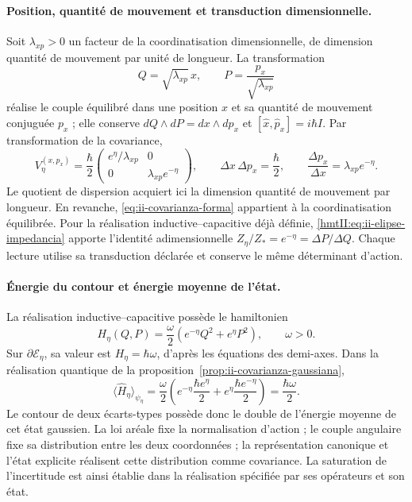\paragraph{Position, quantité de mouvement et transduction dimensionnelle.}
Soit \(\lambda_{xp}>0\) un facteur de la coordinatisation dimensionnelle, de dimension
quantité de mouvement par unité de longueur. La transformation
\[
 Q=\sqrt{\lambda_{xp}}\,x,\qquad
 P=\frac{p_x}{\sqrt{\lambda_{xp}}}
\]
réalise le couple équilibré dans une position \(x\) et sa quantité de mouvement conjuguée
\(p_x\) ; elle conserve \(dQ\wedge dP=dx\wedge dp_x\) et
\([\widehat x,\widehat p_x]=i\hbar I\). Par transformation de la
covariance,
\begin{equation}
 V_\eta^{(x,p_x)}=\frac{\hbar}{2}
 \begin{pmatrix}e^\eta/\lambda_{xp}&0\\
                 0&\lambda_{xp}e^{-\eta}\end{pmatrix},\qquad
 \Delta x\,\Delta p_x=\frac{\hbar}{2},\qquad
 \frac{\Delta p_x}{\Delta x}=\lambda_{xp}e^{-\eta}.
 \label{eq:ii-covarianza-dimensiones}
\end{equation}
Le quotient de dispersion acquiert ici la dimension quantité de mouvement par longueur.
En revanche, \eqref{eq:ii-covarianza-forma} appartient à la coordinatisation équilibrée.
Pour la réalisation inductive--capacitive déjà définie,
\eqref{hmtII:eq:ii-elipse-impedancia} apporte l’identité adimensionnelle
\(Z_\eta/Z_*=e^{-\eta}=\Delta P/\Delta Q\).
Chaque lecture utilise sa transduction déclarée et conserve le même
déterminant d’action.

\paragraph{Énergie du contour et énergie moyenne de l'état.}
La réalisation inductive--capacitive possède le hamiltonien
\[
 H_\eta(Q,P)=\frac{\omega}{2}
 \left(e^{-\eta}Q^2+e^\eta P^2\right),\qquad \omega>0.
\]
Sur \(\partial\mathcal E_\eta\), sa valeur est
\(H_\eta=\hbar\omega\), d'après les équations des demi-axes. Dans la
réalisation quantique de la proposition~\ref{prop:ii-covarianza-gaussiana},
\begin{equation}
 \langle\widehat H_\eta\rangle_{\psi_\eta}
 =\frac{\omega}{2}
 \left(e^{-\eta}\frac{\hbar e^\eta}{2}
       +e^\eta\frac{\hbar e^{-\eta}}{2}\right)
 =\frac{\hbar\omega}{2}.
 \label{eq:ii-energia-contorno-covarianza}
\end{equation}
Le contour de deux écarts-types possède donc le double de
l'énergie moyenne de cet état gaussien. La loi aréale fixe la normalisation
d'action ; le couple angulaire fixe sa distribution entre les deux coordonnées ;
la représentation canonique et l'état explicite réalisent cette distribution
comme covariance. La saturation de l'incertitude est ainsi établie dans
la réalisation spécifiée par ses opérateurs et son état.
